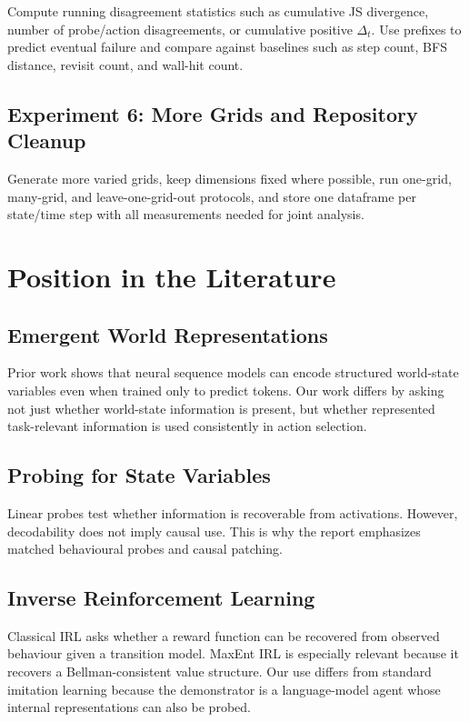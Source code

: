 \documentclass[11pt,a4paper]{article}
\begin{document}
Compute running disagreement statistics such as cumulative JS divergence, number of probe/action disagreements, or cumulative positive $\Delta_t$. Use prefixes to predict eventual failure and compare against baselines such as step count, BFS distance, revisit count, and wall-hit count.

\subsection{Experiment 6: More Grids and Repository Cleanup}

Generate more varied grids, keep dimensions fixed where possible, run one-grid, many-grid, and leave-one-grid-out protocols, and store one dataframe per state/time step with all measurements needed for joint analysis.

\section{Position in the Literature}

\subsection{Emergent World Representations}

Prior work shows that neural sequence models can encode structured world-state variables even when trained only to predict tokens. Our work differs by asking not just whether world-state information is present, but whether represented task-relevant information is used consistently in action selection.

\subsection{Probing for State Variables}

Linear probes test whether information is recoverable from activations. However, decodability does not imply causal use. This is why the report emphasizes matched behavioural probes and causal patching.

\subsection{Inverse Reinforcement Learning}

Classical IRL asks whether a reward function can be recovered from observed behaviour given a transition model. MaxEnt IRL is especially relevant because it recovers a Bellman-consistent value structure. Our use differs from standard imitation learning because the demonstrator is a language-model agent whose internal representations can also be probed.
\end{document}
